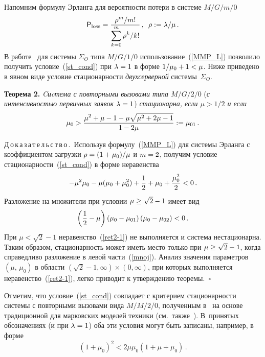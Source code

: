 \begin{multicols}{2}
 Напомним формулу Эрланга для вероятности потери  в
 системе $M/G/m/0$~ \cite{Gnedenko}
\begin{equation} 
\label{MMP_L}
 {\sf P}_{\mathrm{loss}}=\displaystyle\frac{\displaystyle \rho^{m}/m!\mathstrut}{\displaystyle \sum\limits_{k=0}^m \rho^k/k!\mathstrut}\,,\enskip\rho:=\lambda/\mu\,.
\end{equation}
 В работе~\cite{MorNek} для системы $\Sigma_O$ типа $M/G/1/0 $  использование~(\ref{MMP_L})
позволило получить условие~(\ref{st_cond}) при $\lambda\hm=1$ в  форме
$1/\mu_0\hm+1\hm<\mu$. Ниже приведено в явном виде условие стационарности
{\it двухсерверной} сис\-те\-мы~$\Sigma_O$. 

\medskip

\noindent
\textbf{Теорема 2.}
 {\it Cиcтема с повторными вызовами  типа $M/G/2/0$} (\textit{с
интенсивностью первичных заявок $\lambda\hm=1$}) \textit{стационарна, если $\mu>1/2$  и
если} 
\begin{equation*} 
 \mu_0>\displaystyle\frac{\displaystyle \mu^2+\mu-1-\mu \sqrt{\mu^2+2\mu-1}\mathstrut}{\displaystyle 1-2 \mu\mathstrut}:=\mu_{01}\,. 
\end{equation*} 

\smallskip

\noindent
Д\,о\,к\,а\,з\,а\,т\,е\,л\,ь\,с\,т\,в\,о\,.\ Используя
формулу~(\ref{MMP_L}) для системы Эрланга с коэффициентом загрузки
 $\rho\hm= (1\hm+\mu_0)/\mu$ и $m\hm=2$, получим условие стационарности~(\ref{st_cond}) в
 форме  неравенства 
\begin{equation} 
\label{ret2-1}
-\mu^2\mu_0-\mu(\mu_0+\mu_0^2)+\displaystyle\frac{\displaystyle 1\mathstrut}{\displaystyle 2\mathstrut}+\mu_0+\displaystyle\frac{\displaystyle \mu_0^2\mathstrut}{\displaystyle 2\mathstrut}<0\,.
\end{equation}
 Разложение на множители при условии $\mu\hm\ge \sqrt{2}-1$ имеет вид
\begin{equation} 
\label{mnoj}
\left(\displaystyle\frac{\displaystyle 1\mathstrut}{\displaystyle 2\mathstrut}-\mu\right)\left(\mu_0-\mu_{01}\right)\left(\mu_0-\mu_{02}\right)<0\,. 
\end{equation}
При $\mu < \sqrt{2}-1$ неравенство~(\ref{ret2-1}) не выполняется и
сис\-те\-ма нестационарна. Таким образом, стационарность может иметь
место только при $\mu\hm\ge \sqrt{2}-1$, когда справедливо разложение в
левой части~(\ref{mnoj}). Анализ значения  параметров
$(\mu,\,\mu_0)$ в области $ (\sqrt{2}-1, \infty)\times (0, \infty)$,
при которых выполняется неравенство~(\ref{ret2-1}), легко приводит к
утверждению  теоремы.\hfill~$\square$

Отметим, что  условие~(\ref{st_cond}) совпадает с критерием
стационарности   системы с повторными вызовами вида $M/M/2/0$,
полученным в~\cite{A96} на основе традиционной для марковских моделей техники   (см.\ также~\cite {AGN01}).
 В~принятых обозначениях  (и  при $\lambda\hm=1$) оба эти условия могут
быть записаны, например,  в форме
\begin{equation*}
\left(1+\mu_0\right)^2<2 \mu \mu_0\left(1+\mu+\mu_0\right)\,.
\end{equation*}


\end{multicols}
